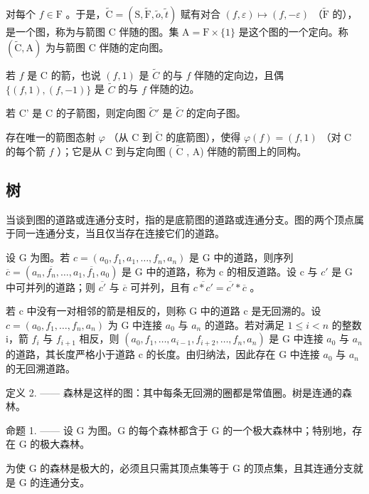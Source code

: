 对每个 \(f \in \mathrm{F}\) 。于是，\(\widetilde{\mathrm{C}} = (\mathrm{S}, \widetilde{\mathrm{F}}, \widetilde{o}, \widetilde{t})\) 赋有对合 \((f, \varepsilon) \mapsto (f, -\varepsilon)\) （\(\widetilde{\mathrm{F}}\) 的），是一个图，称为与箭图 C 伴随的图。集 \(\mathrm{A} = \mathrm{F} \times \{1\}\) 是这个图的一个定向。称 \((\widetilde{\mathrm{C}}, \mathrm{A})\) 为与箭图 C 伴随的定向图。

若 \(f\) 是 C 的箭，也说 \((f,1)\) 是 \(\widetilde{C}\) 的与 \(f\) 伴随的定向边，且偶 \(\{(f,1),(f,-1)\}\) 是 \(\widetilde{C}\) 的与 \(f\) 伴随的边。

若 C' 是 C 的子箭图，则定向图 \(\widetilde{C}'\) 是 \(\widetilde{C}\) 的定向子图。

存在唯一的箭图态射 \(\varphi\) （从 C 到 \(\widetilde{\mathrm{C}}\) 的底箭图），使得 \(\varphi(f) = (f,1)\) （对 C 的每个箭 \(f\) ）；它是从 C 到与定向图 ( \(\widetilde{\mathrm{C}}\) , A) 伴随的箭图上的同构。

\subsection{树}

当谈到图的道路或连通分支时，指的是底箭图的道路或连通分支。图的两个顶点属于同一连通分支，当且仅当存在连接它们的道路。

设 G 为图。若 \(c = (a_{0}, f_{1}, a_{1}, \ldots, f_{n}, a_{n})\) 是 G 中的道路，则序列 \(\overline{c} = (a_{n}, \overline{f_{n}}, \ldots, a_{1}, \overline{f_{1}}, a_{0})\) 是 G 中的道路，称为 c 的相反道路。设 c 与 \(c'\) 是 G 中可并列的道路；则 \(\overline{c'}\) 与 \(\overline{c}\) 可并列，且有 \(\overline{c * c'} = \overline{c'} * \overline{c}\) 。

若 c 中没有一对相邻的箭是相反的，则称 G 中的道路 c 是无回溯的。设 \(c = (a_{0}, f_{1}, \ldots, f_{n}, a_{n})\) 为 G 中连接 \(a_{0}\) 与 \(a_{n}\) 的道路。若对满足 \(1 \leqslant i < n\) 的整数 i，箭 \(f_{i}\) 与 \(f_{i+1}\) 相反，则 \((a_{0}, f_{1}, \ldots, a_{i-1}, f_{i+2}, \ldots, f_{n}, a_{n})\) 是 G 中连接 \(a_{0}\) 与 \(a_{n}\) 的道路，其长度严格小于道路 c 的长度。由归纳法，因此存在 G 中连接 \(a_{0}\) 与 \(a_{n}\) 的无回溯道路。

定义 2. —— 森林是这样的图：其中每条无回溯的圈都是常值圈。树是连通的森林。

命题 1. —— 设 G 为图。G 的每个森林都含于 G 的一个极大森林中；特别地，存在 G 的极大森林。

为使 G 的森林是极大的，必须且只需其顶点集等于 G 的顶点集，且其连通分支就是 G 的连通分支。

